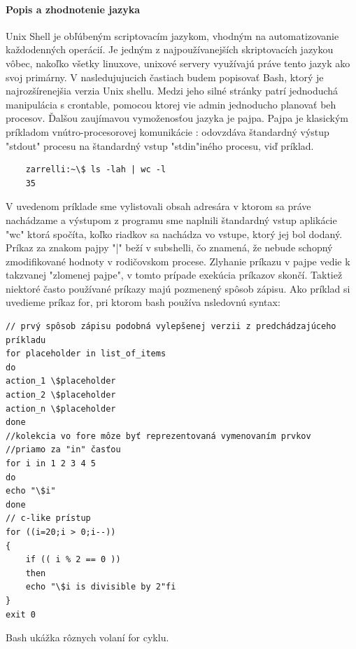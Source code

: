 \paragraph{Popis a zhodnotenie jazyka}
\indent
Unix Shell je obľúbeným scriptovacím jazykom, vhodným na automatizovanie každodenných operácií. Je jedným z najpoužívanejších skriptovacích jazykou vôbec, nakoľko všetky linuxove, unixové servery využívajú práve tento jazyk ako svoj primárny. V nasledujujucich častiach budem popisovať Bash, ktorý je najrozšírenejšia verzia Unix shellu. Medzi jeho silné stránky patrí jednoduchá manipulácia s crontable, pomocou ktorej vie admin jednoducho planovať beh procesov. Ďalšou zaujímavou vymoženosťou jazyka je pajpa. Pajpa je klasickým príkladom vnútro-procesorovej komunikácie : odovzdáva štandardný výstup "stdout" procesu na štandardný vstup "stdin"iného procesu, viď príklad.
\begin{verbatim}
	zarrelli:~\$ ls -lah | wc -l
	35
\end{verbatim}
V uvedenom príklade sme vylistovali obsah adresára v ktorom sa práve nachádzame a výstupom z programu sme naplnili štandardný vstup aplikácie "wc" ktorá spočíta, koľko riadkov sa nachádza vo vstupe, ktorý jej bol dodaný. Príkaz za znakom pajpy "|" beží v subshelli, čo znamená, že nebude schopný zmodifikované hodnoty v rodičovskom procese. Zlyhanie príkazu v pajpe vedie k takzvanej "zlomenej pajpe", v tomto prípade exekúcia príkazov skončí. \cite{mbash}
\newpage
Taktiež niektoré často používané príkazy majú pozmenený spôsob zápisu.
Ako príklad si uvedieme príkaz for, pri ktorom bash používa nsledovnú syntax:

\begin{algorithm}
	\begin{verbatim}
// prvý spôsob zápisu podobná vylepšenej verzii z predchádzajúceho príkladu
for placeholder in list_of_items
do
action_1 \$placeholder
action_2 \$placeholder
action_n \$placeholder
done
//kolekcia vo fore môze byť reprezentovaná vymenovaním prvkov 
//priamo za "in" časťou
for i in 1 2 3 4 5
do
echo "\$i"
done
// c-like prístup
for ((i=20;i > 0;i--))
{
	if (( i % 2 == 0 ))
	then
	echo "\$i is divisible by 2"fi
}
exit 0
	\end{verbatim} 
	\caption{Bash ukážka rôznych volaní for cyklu. \cite{mbash}}
\label{alg:gen}
\end{algorithm}

